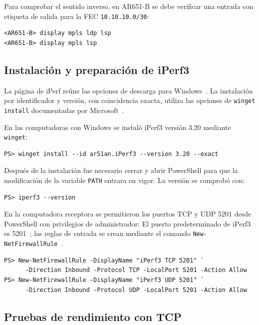 Para comprobar el sentido inverso, en AR651-B se debe verificar una entrada
con etiqueta de salida para la FEC \texttt{10.10.10.0/30}:

\begin{lstlisting}[style=terminal]
<AR651-B> display mpls ldp lsp
<AR651-B> display mpls lsp
\end{lstlisting}

\subsection{Instalación y preparación de iPerf3}

La página de iPerf reúne las opciones de descarga para Windows~\cite{gueant_iperf_2026}.
La instalación por identificador y versión, con coincidencia exacta, utiliza
las opciones de \texttt{winget install} documentadas por
Microsoft~\cite{microsoft-winget-install}.

En las computadoras con Windows se instaló iPerf3 versión 3.20 mediante
\texttt{winget}:

\begin{lstlisting}[style=terminal]
PS> winget install --id ar51an.iPerf3 --version 3.20 --exact
\end{lstlisting}

Después de la instalación fue necesario cerrar y abrir PowerShell para que
la modificación de la variable \texttt{PATH} entrara en vigor. La versión se
comprobó con:

\begin{lstlisting}[style=terminal]
PS> iperf3 --version
\end{lstlisting}

En la computadora receptora se permitieron los puertos TCP y UDP 5201 desde
PowerShell con privilegios de administrador:
El puerto predeterminado de iPerf3 es 5201~\cite{esnet-iperf3-manual};
las reglas de entrada se crean mediante el comando
\texttt{New-NetFirewallRule}~\cite{microsoft-new-netfirewallrule}.


\begin{lstlisting}[style=terminal]
PS> New-NetFirewallRule -DisplayName "iPerf3 TCP 5201" `
      -Direction Inbound -Protocol TCP -LocalPort 5201 -Action Allow
PS> New-NetFirewallRule -DisplayName "iPerf3 UDP 5201" `
      -Direction Inbound -Protocol UDP -LocalPort 5201 -Action Allow
\end{lstlisting}

\subsection{Pruebas de rendimiento con TCP}

